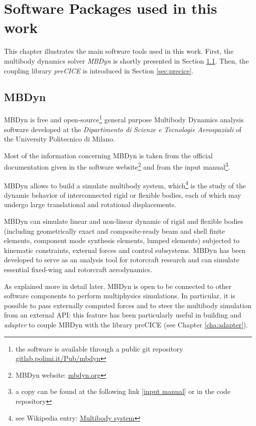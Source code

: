 \chapter{Software Packages used in this work}
\label{cha:software}

This chapter illustrates the main software tools used in this work. First, the multibody dynamics solver \textit{MBDyn}  is shortly presented in Section \ref{sec:mbdyn}. Then, the coupling library \textit{preCICE} is introduced in Section \ref{sec:precice}.


\section{MBDyn}
\label{sec:mbdyn}


MBDyn is free and open-source\footnote{the software is available through a public git repository \href{https://gitlab.polimi.it/Pub/mbdyn}{gitlab.polimi.it/Pub/mbdyn}} general purpose Multibody Dynamics analysis software developed at the \textit{Dipartimento di Scienze e Tecnologie Aerospaziali}  of the University Politecnico di Milano.

Most of the information concerning MBDyn is taken from the official documentation given in the software website\footnote{MBDyn website: \href{https://www.mbdyn.org/}{mbdyn.org}} and from the input manual\footnote{a copy can be found at the following link [\href{https://www.mbdyn.org/userfiles/documents/mbdyn-input-1.7.3.pdf}{input manual}] or in the code repository}.

MBDyn allows to build a simulate multibody system, which\footnote{see Wikipedia entry: \href{https://en.wikipedia.org/wiki/Multibody_system}{Multibody system}} is the study of the dynamic behavior of interconnected rigid or flexible bodies, each of which may undergo large translational and rotational displacements.

MBDyn can simulate linear and non-linear dynamic of rigid and flexible bodies (including geometrically exact and composite-ready beam and shell finite elements, component mode synthesis elements, lumped elements) subjected to kinematic constraints, external forces and control subsystems\cite{masarati2014efficient}. 
MBDyn has been developed to serve as an analysis tool for rotorcraft research and can simulate essential fixed-wing and rotorcraft aerodynamics.

As explained more in detail later, MBDyn is open to be connected to other software components to perform multiphysics simulations. In particular, it is possible to pass externally computed forces  and to steer the multibody simulation from an external API: this feature has been particularly useful in building and \textit{adapter} to couple MBDyn with the library preCICE (see Chapter \ref{cha:adapter}).

